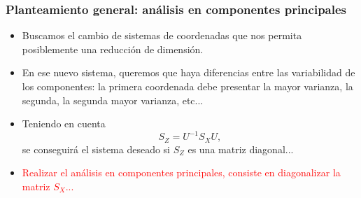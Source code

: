 \documentclass{beamer}
\begin{document}
       \begin{frame}\frametitle{Planteamiento general: análisis en componentes principales}
    \begin{itemize}
    \item<+-> Buscamos el cambio de sistemas de coordenadas que nos permita posiblemente una reducción de dimensión.
    \item<+-> En ese nuevo sistema, queremos que haya diferencias entre las variabilidad de los componentes: la primera coordenada debe presentar la mayor varianza, la segunda, la segunda mayor varianza, etc...
\item<+-> Teniendo en cuenta
\begin{equation*}
S_Z=U^{-1}S_XU,
\end{equation*}
se conseguirá el sistema deseado si $S_Z$ es una matriz diagonal...
\item<+-> \textcolor{red}{Realizar el análisis en componentes principales, consiste en diagonalizar la matriz $S_X$...}
    \end{itemize}
    
 \end{frame}
\end{document}
